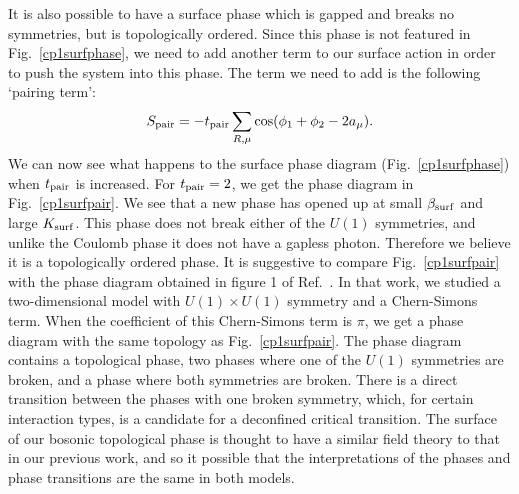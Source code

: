 \documentclass[prb,twocolumn]{revtex4-1}
\begin{document}
It is also possible to have a surface phase which is gapped and breaks no symmetries, but is topologically ordered.\cite{SenthilVishwanath} Since this phase is not featured in Fig.~\ref{cp1surfphase}, we need to add another term to our surface action in order to push the system into this phase. The term we need to add is the following `pairing term':\cite{Max}
\begin{equation}
S_{\rm pair}=-t_{\rm pair}\sum_{R,\mu} \cos(\phi_1+\phi_2-2a_\mu).
\label{pairing}
\end{equation} 
We can now see what happens to the surface phase diagram (Fig.~\ref{cp1surfphase}) when $t_{\rm pair}$ is increased. For $t_{\rm pair}=2$, we get the phase diagram in Fig.~\ref{cp1surfpair}. We see that a new phase has opened up at small $\beta_{\rm surf}$ and large $K_{\rm surf}$. This phase does not break either of the $U(1)$ symmetries, and unlike the Coulomb phase it does not have a gapless photon. Therefore we believe it is a topologically ordered phase. It is suggestive to compare Fig.~\ref{cp1surfpair} with the phase diagram obtained in figure 1 of Ref.~. In that work, we studied a two-dimensional model with $U(1)\times U(1)$ symmetry and a Chern-Simons term. When the coefficient of this Chern-Simons term is $\pi$, we get a phase diagram with the same topology as Fig.~\ref{cp1surfpair}. The phase diagram contains a topological phase, two phases where one of the $U(1)$ symmetries are broken, and a phase where both symmetries are broken. There is a direct transition between the phases with one broken symmetry, which, for certain interaction types, is a candidate for a deconfined critical transition.\cite{Gen2Loops} The surface of our bosonic topological phase is thought to have a similar field theory to that in our previous work,\cite{Loopy,Gen2Loops} and so it possible that the interpretations of the phases and phase transitions are the same in both models.
\end{document}
